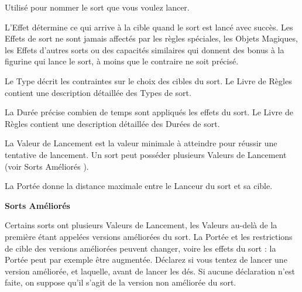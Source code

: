 \begin{multicols}{3}\raggedcolumns

\begin{center}

Utilisé pour nommer le sort que vous voulez lancer.

\basicsubtitle{\spellsEffect}

L'Effet détermine ce qui arrive à la cible quand le sort est lancé avec succès. Les Effets de sort ne sont jamais affectés par les règles spéciales, les Objets Magiques, les Effets d'autres sorts ou des capacités similaires qui donnent des bonus à la figurine qui lance le sort, à moins que le contraire ne soit précisé.
\end{center}

\vspace*{\fill}\columnbreak

\begin{center}
\basicsubtitle{\spellsType}

Le Type décrit les contraintes sur le choix des cibles du sort. Le Livre de Règles contient une description détaillée des Types de sort.

\basicsubtitle{\spellsDuration}

La Durée précise combien de temps sont appliqués les effets du sort. Le Livre de Règles contient une description détaillée des Durées de sort.
\end{center}
\vspace*{\fill}\columnbreak

\begin{center}

La Valeur de Lancement est la valeur minimale à atteindre pour réussir une tentative de lancement. Un sort peut posséder plusieurs Valeurs de Lancement (voir \og Sorts Améliorés \fg{}).

\basicsubtitle{\spellsRange}

La Portée donne la distance maximale entre le Lanceur du sort et sa cible.
\end{center}
\vspace*{\fill}
\end{multicols}

\vspace*{5pt}

\textbf{\Largerfontsize{}Sorts Améliorés}

\vspace*{5pt}

Certains sorts ont plusieurs Valeurs de Lancement, les Valeurs au-delà de la première étant appelées versions améliorées du sort. La Portée et les restrictions de cible des versions améliorées peuvent changer, voire les effets du sort : la Portée peut par exemple être augmentée. Déclarez si vous tentez de lancer une version améliorée, et laquelle, avant de lancer les dés. Si aucune déclaration n'est faite, on suppose qu'il s'agit de la version non améliorée du sort.

